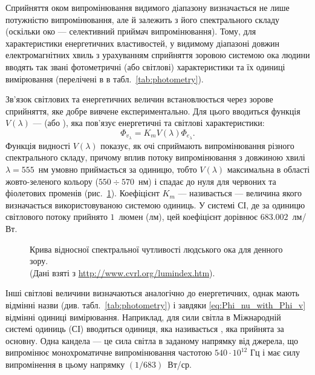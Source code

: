 Сприйняття оком випромінювання видимого діапазону визначається не лише потужністю випромінювання, але й залежить з його спектрального складу (оскільки око --- селективний приймач випромінювання). Тому, для характеристики енергетичних властивостей, у видимому діапазоні довжин електромагнітних хвиль з урахуванням сприйняття зоровою системою ока людини  вводять так звані фотометричні (або світлові) характеристики та їх одиниці вимірювання (перелічені в в табл.~\ref{tab:photometry}).

Зв'язок світлових та енергетичних величин встановлюється через зорове сприйняття, яке добре вивчене експериментально.  Для цього вводиться функція $ V(\lambda) $ ---  (або ), яка пов'язує енергетичні та світлові характеристики:
\begin{equation}\label{eq:Phi_nu_with_Phi_v}
	\Phi_{v_{\lambda}} = K_m V(\lambda) \Phi_{e_{\lambda}}.
\end{equation}
Функція видності $V(\lambda)$ показує, як очі сприймають випромінювання різного спектрального складу, причому вплив потоку випромінювання з довжиною хвилі $\lambda = 555$~нм умовно приймається за одиницю, тобто $V(\lambda)$ максимальна в області жовто-зеленого кольору ($550 \div 570$~нм) і спадає до нуля для червоних та фіолетових променів (рис.~\ref{plt:LF}). Коефіцієнт $K_{m}$ --- називається  --- величина якого визначається використовуваною системою одиниць. У системі СІ, де за одиницю світлового потоку прийнято $1$~люмен (лм), цей коефіцієнт дорівнює $683.002$~лм/Вт.

\begin{figure}[h!]\centering
	
	\caption{Крива відносної спектральної чутливості людського ока для денного зору.
        \\ (Дані взяті з \url{http://www.cvrl.org/lumindex.htm}).
    }
	\label{plt:LF}
\end{figure}

Інші світлові величини визначаються аналогічно до енергетичних, однак мають відмінні назви (див. табл.~\ref{tab:photometry}) і завдяки \eqref{eq:Phi_nu_with_Phi_v} відмінні одиниці вимірювання. Наприклад, для сили світла в Міжнародній системі одиниць (СІ) вводиться одиниця, яка називається , яка прийнята за основну. Одна кандела --- це сила світла в заданому напрямку від джерела, що випромінює монохроматичне випромінювання частотою $540\cdot10^{12}$ Гц і має силу випромінення в цьому напрямку $(1/683)$~Вт/ср.

